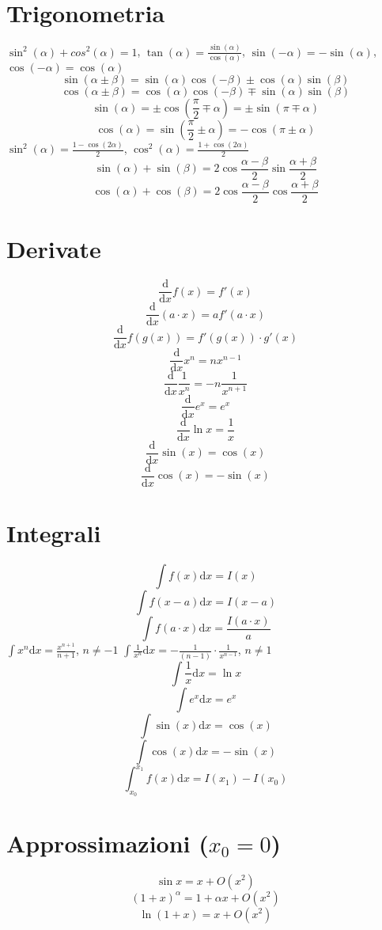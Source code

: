 \documentclass{article}
\begin{document}
\begin{small}
\begin{multicols}{3}
\section{Trigonometria}
		$ \sin^2 ( \alpha ) + cos^2 ( \alpha ) = 1 $, $ \tan ( \alpha ) = \frac{ \sin ( \alpha ) }{ \cos ( \alpha ) } $,
		$ \sin ( - \alpha ) = - \sin ( \alpha ) $, $ \cos ( - \alpha ) = \cos ( \alpha ) $
		\[ \sin ( \alpha \pm \beta ) = \sin ( \alpha ) \cos ( - \beta ) \pm \cos ( \alpha ) \sin ( \beta ) \]
		\[ \cos ( \alpha \pm \beta ) = \cos ( \alpha ) \cos ( - \beta ) \mp \sin ( \alpha ) \sin ( \beta ) \]
		\[ \sin ( \alpha ) = \pm \cos ( \frac{ \pi }{2} \mp \alpha ) = \pm \sin ( \pi \mp \alpha ) \]
		\[ \cos ( \alpha ) = \sin ( \frac{ \pi }{2} \pm \alpha ) = - \cos ( \pi \pm \alpha ) \]
		$ \sin^2 ( \alpha ) = \frac{ 1 - \cos ( 2 \alpha ) }{2} $, $ \cos^2 ( \alpha ) = \frac{ 1 + \cos ( 2 \alpha ) }{2} $
		\[ \sin ( \alpha ) + \sin ( \beta ) = 2 \cos \frac{ \alpha - \beta }{2} \sin \frac{ \alpha + \beta }{2} \]
		\[ \cos ( \alpha ) + \cos ( \beta ) = 2 \cos \frac{ \alpha - \beta }{2} \cos \frac{ \alpha + \beta }{2} \]
\section{Derivate}
		\[ \frac{ \mathrm d }{ \mathrm d x} f ( x ) = f' ( x ) \]
		\[ \frac{ \mathrm d }{ \mathrm d x} ( a \cdot x ) = a f' ( a \cdot x ) \]
		\[ \frac{ \mathrm d }{ \mathrm d x} f ( g ( x ) ) = f' ( g ( x ) ) \cdot g' ( x ) \]
		\[ \frac{ \mathrm d }{ \mathrm d x} x^n = n x^{n-1} \]
		\[ \frac{ \mathrm d }{ \mathrm d x} \frac{1}{ x^n } = - n \frac{1}{ x^{n+1} } \]
		\[ \frac{ \mathrm d }{ \mathrm d x} e^x = e^x \]
		\[ \frac{ \mathrm d }{ \mathrm d x} \ln x = \frac{1}{ x } \]
		\[ \frac{ \mathrm d }{ \mathrm d x} \sin ( x ) = \cos ( x ) \]
		\[ \frac{ \mathrm d }{ \mathrm d x} \cos ( x ) = - \sin ( x ) \]
\section{Integrali}
		\[ \int f ( x ) \mathrm d x = I ( x ) \]
		\[ \int f ( x - a ) \mathrm d x = I ( x - a ) \]
		\[ \int f ( a \cdot x ) \mathrm d x = \frac{ I (a \cdot x) }{ a } \]
		$ \int x^n \mathrm d x = \frac{ x^{n+1} }{ n+1 } $, $ n \neq -1 $
		$ \int \frac{1}{ x^n } \mathrm d x = - \frac{1}{ ( n-1 ) } \cdot \frac{1}{ x^{n-1} } $, $ n \neq 1 $
		\[ \int \frac{1}{ x } \mathrm d x = \ln x \]
		\[ \int e^x \mathrm d x = e^x \]
		\[ \int \sin ( x ) \mathrm d x = \cos ( x ) \]
		\[ \int \cos ( x ) \mathrm d x = - \sin ( x ) \]
		\[ \int_{x_0}^{x_1} f ( x ) \mathrm d x = I ( x_1 ) - I ( x_0 ) \]
\section{Approssimazioni ($x_0 = 0$)}
		\[ \sin x = x + O ( x^2 ) \]
		\[ ( 1 + x )^{\alpha} = 1 + \alpha x + O ( x^2 ) \]
		\[ \ln ( 1 + x ) = x + O ( x^2 ) \]

	\end{multicols}
	\end{small}
\end{document}
